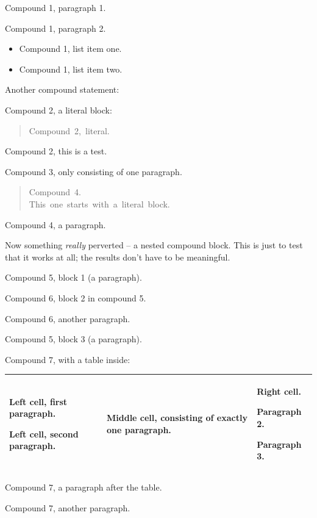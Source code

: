 \documentclass[a4paper]{article}
\newlength{\DUtablewidth} %
\begin{document}
Compound 1, paragraph 1.

Compound 1, paragraph 2.
%
\begin{itemize}

\item Compound 1, list item one.

\item Compound 1, list item two.

\end{itemize}

Another compound statement:

Compound 2, a literal block:
%
\begin{quote}{\ttfamily \raggedright \noindent
Compound~2,~literal.
}
\end{quote}
Compound 2, this is a test.

Compound 3, only consisting of one paragraph.
%
\begin{quote}{\ttfamily \raggedright \noindent
Compound~4.\\
This~one~starts~with~a~literal~block.
}
\end{quote}
Compound 4, a paragraph.

Now something \emph{really} perverted -- a nested compound block.  This is
just to test that it works at all; the results don't have to be
meaningful.

Compound 5, block 1 (a paragraph).

Compound 6, block 2 in compound 5.

Compound 6, another paragraph.

Compound 5, block 3 (a paragraph).

Compound 7, with a table inside:

\leavevmode
\setlength{\DUtablewidth}{\linewidth}
\begin{longtable}[c]{|p{0.249\DUtablewidth}|p{0.249\DUtablewidth}|p{0.249\DUtablewidth}|}
\hline

Left cell, first
paragraph.

Left cell, second
paragraph.
 & 
Middle cell,
consisting of
exactly one
paragraph.
 & 
Right cell.

Paragraph 2.

Paragraph 3.
 \\
\hline
\end{longtable}
Compound 7, a paragraph after the table.

Compound 7, another paragraph.


\end{document}
